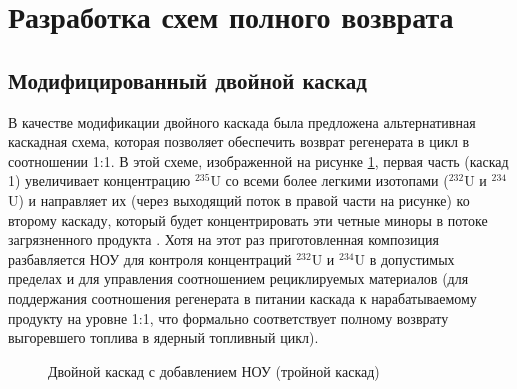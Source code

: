 \section{Разработка схем полного возврата}\label{sec:ch2/sec3}
\subsection{Модифицированный двойной каскад}

В качестве модификации двойного каскада была предложена альтернативная каскадная схема, которая позволяет обеспечить возврат регенерата в цикл в соотношении 1:1. В этой схеме, изображенной 
на рисунке \ref{fig:vestnik}, первая часть (каскад 1) увеличивает 
концентрацию $^{235}$U со всеми более легкими изотопами ($^{232}$U и $^{234}$U) и направляет их (через выходящий поток в правой части на рисунке) ко второму каскаду, который будет концентрировать эти четные миноры в потоке загрязненного продукта \cite{smirnovObogashchenieRegenerirovannogoUrana2018}.
Хотя на этот раз приготовленная композиция разбавляется НОУ для контроля концентраций $^{232}$U и $^{234}$U в допустимых пределах и для управления соотношением рециклируемых материалов (для поддержания соотношения регенерата в питании каскада к нарабатываемому продукту на уровне 1:1, что формально соответствует полному возврату выгоревшего топлива в ядерный топливный цикл).

\begin{figure}[ht]
  \caption{Двойной каскад с добавлением НОУ (тройной каскад)}\label{fig:vestnik}
\end{figure}

